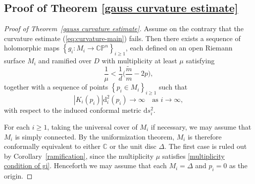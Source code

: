 \documentclass[english, 12pt]{amsart}
\theoremstyle{plain}
\theoremstyle{remark}
\numberwithin{equation}{section}
\theoremstyle{plain}
\theoremstyle{named}
\begin{document}
\subsection{Proof of Theorem \ref{gauss curvature estimate}}
\begin{proof}[Proof of Theorem~\ref{gauss curvature estimate}]
	Assume on the contrary that the curvature estimate (\ref{eq:curvature-main}) fails. Then there exists a sequence of holomorphic maps $\left\{g_i\colon M_i\rightarrow \mathbb{CP}^n\right\}_{i\geq 1}$, each defined on an open Riemann surface $M_i$ and ramified over $D$ with multiplicity at least $\mu$ satisfying
	\begin{equation}
		\label{multiplicity condition of gi}
		\dfrac{1}{\mu}<\dfrac{1}{d}\bigg(\dfrac{\widetilde{m}}{m}-2p\bigg),
	\end{equation}
	together with a sequence of points $\left\{p_i\in M_i\right\}_{i\geq 1}$ such that
	\[|K_i(p_i)| \mathrm{d}_i^2(p_i)\rightarrow\infty\quad \text{as $i\to\infty$},\]
	with respect to the induced conformal metric $\mathrm{d}s_i^2$. 
	
	For each $i\geq 1$, taking the universal cover of $M_i$ if necessary, we may assume that $M_i$ is simply connected. By the uniformization theorem, $M_i$ is therefore conformally equivalent to either $\mathbb{C}$ or the unit disc $\Delta$. The first case is ruled out by Corollary~\ref{ramification}, since the multiplicity $\mu$ satisfies \eqref{multiplicity condition of gi}. Henceforth we may assume that each $M_i=\Delta$ and $p_i=0$ as the origin. 
	

\end{proof}
\end{document}
